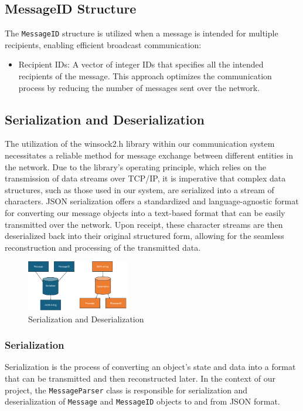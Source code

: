 \subsection{MessageID Structure}
The \texttt{MessageID} structure is utilized when a message is intended for multiple recipients, enabling efficient broadcast communication:

\begin{itemize}
    \item Recipient IDs: A vector of integer IDs that specifies all the intended recipients of the message. This approach optimizes the communication process by reducing the number of messages sent over the network.
\end{itemize}


\subsection{Serialization and Deserialization}

The utilization of the winsock2.h library within our communication system necessitates a reliable method for message exchange between different entities in the network. Due to the library's operating principle, which relies on the transmission of data streams over TCP/IP, it is imperative that complex data structures, such as those used in our system, are serialized into a stream of characters. JSON serialization offers a standardized and language-agnostic format for converting our message objects into a text-based format that can be easily transmitted over the network. Upon receipt, these character streams are then deserialized back into their original structured form, allowing for the seamless reconstruction and processing of the transmitted data.

\begin{figure}[ht]
    \centering
    \includegraphics[width=0.4\textwidth]{images/serialization_deserialization.png}
    \caption{Serialization and Deserialization}
    \label{img:serialization_deserialization}
\end{figure}

\subsubsection{Serialization}
Serialization is the process of converting an object's state and data into a format that can be transmitted and then reconstructed later. In the context of our project, the \texttt{MessageParser} class is responsible for serialization and deserialization of \texttt{Message} and \texttt{MessageID} objects to and from JSON format.

